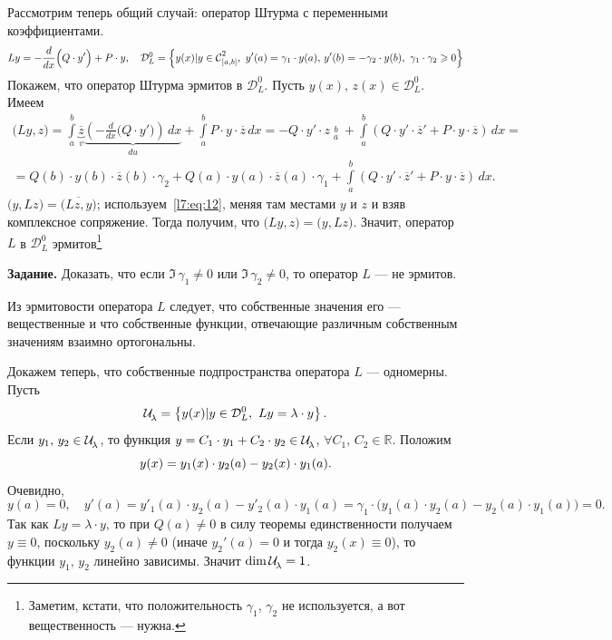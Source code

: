 \documentclass[12pt,a4paper,openany,fleqn]{book}
\newcommand{\Cf}{\ensuremath{\mathcal{C}}}
\newcommand{\mc}[1]{\ensuremath{\mathcal{#1}}}
\newcommand{\Cfn}[2][]{\ensuremath{\Cf{\mathstrut}^{#2}_{#1}}}
\newcommand{\der}[2]{\ensuremath{\frac{d#1}{d#2}}}
\newcommand{\Ul}[1][\lambda]{\ensuremath{\mc{U}\!{\mathstrut}_{#1}}}
\theoremstyle{definition}
\begin{document}
	Рассмотрим теперь общий случай: оператор Штурма с переменными коэффициентами.
	\begin{equation*}
		Ly=-\der{}{x}\Big(Q\cdot y'\Big)+P\cdot y,\quad\mc{D}_{L}^{0}=\left\{y(x)|y\in\Cfn[{[a,b]}]{2},\ y'(a)=\gamma_1\cdot y(a),\,y'(b)=-\gamma_2\cdot y(b),\ \gamma_1\cdot\gamma_2\geqslant0\right\}
	\end{equation*}
	Покажем, что оператор Штурма эрмитов в $\mc{D}_{L}^{0}$. Пусть $y(x),\,z(x)\in\mc{D}_{L}^{0}$. Имеем 
	\begin{multline}
		\label{l7:eq:12}
		\big(Ly,z\big)=\int\limits_a^b\underbrace{\overline{z}}_{v}\underbrace{\left(-\der{}{x}\Big(Q\cdot y'\Big)\right)\,dx}_{du}+\int\limits_a^b P\cdot y\cdot\overline{z}\,dx=-Q\cdot y'\cdot z\mathop{\Big|}\limits_a^b+\int\limits_a^b\left(Q\cdot y'\cdot\overline{z}'+P\cdot y\cdot\overline{z}\right)\,dx=\\
		=Q(b)\cdot y(b)\cdot\overline{z}(b)\cdot\gamma_2+Q(a)\cdot y(a)\cdot\overline{z}(a)\cdot\gamma_1+\int\limits_a^b\left(Q\cdot y'\cdot\overline{z}'+P\cdot y\cdot\overline{z}\right)\,dx.
	\end{multline}
	$\big(y,Lz\big)=\overline{\big(Lz,y\big)}$; используем~\eqref{l7:eq:12}, меняя там местами $y$ и $z$ и взяв комплексное сопряжение. Тогда получим, что $\big(Ly,z\big)=\big(y,Lz\big)$. Значит, оператор $L$ в $\mc{D}_{L}^{0}$ эрмитов\footnote{Заметим, кстати, что положительность $\gamma_1$, $\gamma_2$ не используется, а вот вещественность --- нужна.}
	\vspace{0.2cm}
	
	\noindent\textbf{Задание.} Доказать, что если $\Im\,\gamma_1\neq0$ или $\Im\,\gamma_2\neq0$, то оператор $L$ --- не эрмитов.
	\vspace{0.2cm}
	
	Из эрмитовости оператора $L$ следует, что собственные значения его --- вещественные и что собственные функции, отвечающие различным собственным значениям взаимно ортогональны.
	
	Докажем теперь, что собственные подпространства оператора $L$ --- одномерны. Пусть
	\begin{equation*}
		\hfill\Ul=\left\{y(x)|y\in\mc{D}_L^0,\ Ly=\lambda\cdot y\right\}.\hfill
	\end{equation*}    
	Если $y_1,\,y_2\in\Ul$, то функция $y=C_1\cdot y_1+C_2\cdot y_2\in\Ul$, $\forall C_1,\,C_2\in\mathbb{R}$. Положим
	\begin{equation*}
		\hfill y(x)=y_1(x)\cdot y_2(a)-y_2(x)\cdot y_1(a).\hfill
	\end{equation*}
	Очевидно,
	\begin{equation*}
		y(a)=0,\quad y'(a)=y'_1(a)\cdot y_2(a)-y'_2(a)\cdot y_1(a)=\gamma_1\cdot\big(y_1(a)\cdot y_2(a)-y_2(a)\cdot y_1(a)\big)=0.
	\end{equation*} 
	Так как $Ly=\lambda\cdot y$, то при $Q(a)\neq0$ в силу теоремы единственности получаем $y\equiv0$, поскольку $y_2(a)\neq0$ (иначе $y_2'(a)=0$ и тогда $y_2(x)\equiv0$), то функции $y_1,\,y_2$ линейно зависимы. Значит $\dim\Ul=1$.
	
\end{document}
